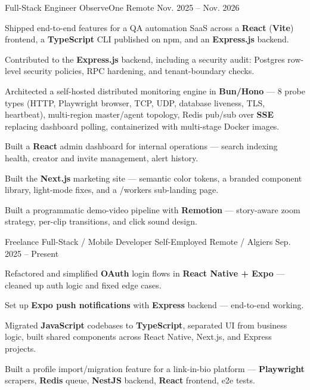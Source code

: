 \begin{cventries}

  \cventry
  {Full-Stack Engineer}
  {ObserveOne}
  {Remote}
  {Nov. 2025 -- Nov. 2026}
  {
    \begin{cvitems}
      \item {Shipped end-to-end features for a QA automation SaaS across a \textbf{React} (\textbf{Vite}) frontend, a \textbf{TypeScript} CLI published on npm, and an \textbf{Express.js} backend.}
      \item {Contributed to the \textbf{Express.js} backend, including a security audit: Postgres row-level security policies, RPC hardening, and tenant-boundary checks.}
      \item {Architected a self-hosted distributed monitoring engine in \textbf{Bun/Hono} — 8 probe types (HTTP, Playwright browser, TCP, UDP, database liveness, TLS, heartbeat), multi-region master/agent topology, Redis pub/sub over \textbf{SSE} replacing dashboard polling, containerized with multi-stage Docker images.}
      \item {Built a \textbf{React} admin dashboard for internal operations — search indexing health, creator and invite management, alert history.}
      \item {Built the \textbf{Next.js} marketing site — semantic color tokens, a branded component library, light-mode fixes, and a /workers sub-landing page.}
      \item {Built a programmatic demo-video pipeline with \textbf{Remotion} — story-aware zoom strategy, per-clip transitions, and click sound design.}
    \end{cvitems}
  }


  \cventry
  {Freelance Full-Stack / Mobile Developer}
  {Self-Employed}
  {Remote / Algiers}
  {Sep. 2025 -- Present}
  {
    \begin{cvitems}
      \item {Refactored and simplified \textbf{OAuth} login flows in \textbf{React Native + Expo} — cleaned up auth logic and fixed edge cases.}
      \item {Set up \textbf{Expo push notifications} with \textbf{Express} backend — end-to-end working.}
      \item {Migrated \textbf{JavaScript} codebases to \textbf{TypeScript}, separated UI from business logic, built shared components across React Native, Next.js, and Express projects.}
      \item {Built a profile import/migration feature for a link-in-bio platform — \textbf{Playwright} scrapers, \textbf{Redis} queue, \textbf{NestJS} backend, \textbf{React} frontend, e2e tests.}
    \end{cvitems}
  }


\end{cventries}
